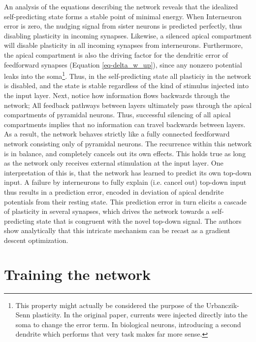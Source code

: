 An analysis of the equations describing the network reveals that the idealized self-predicting state forms a stable
point of minimal energy. When Interneuron error is zero, the nudging signal from sister neurons is predicted perfectly,
thus disabling plasticity in incoming synapses. Likewise, a silenced apical compartment will disable plasticity in all
incoming synapses from interneurons. Furthermore, the apical compartment is also the driving factor for the dendritic
error of feedforward synapses (Equation \ref{eq-delta_w_up}), since any nonzero potential leaks into the
soma\footnote{This property might actually be considered the purpose of the Urbanczik-Senn plasticity. In the original
  paper, currents were injected directly into the soma to change the error term. In biological neurons, introducing a
  second dendrite which performs that very task makes far more sense.}. Thus, in the self-predicting state all plasticiy
in the network is disabled, and the state is stable regardless of the kind of stimulus injected into the input layer.
Next, notice how information flows backwards through the network; All feedback pathways between layers ultimately pass
through the apical compartments of pyramidal neurons. Thus, successful silencing of all apical compartments implies that
no information can travel backwards between layers. As a result, the network behaves strictly like a fully connected
feedforward network consisting only of pyramidal neurons. The recurrence within this network is in balance, and
completely cancels out its own effects. This holds true as long as the network only receives external stimulation at the
input layer. One interpretation of this is, that the network has learned to predict its own top-down input. A failure by
interneurons to fully explain (i.e. cancel out) top-down input thus results in a prediction error, encoded in deviation
of apical dendrite potentials from their resting state. This prediction error in turn elicits a cascade of plasticity in
several synapses, which drives the network towards a self-predicting state that is congruent with the novel top-down
signal. The authors show analytically that this intricate mechanism can be recast as a gradient descent optimization.



\section{Training the network}

